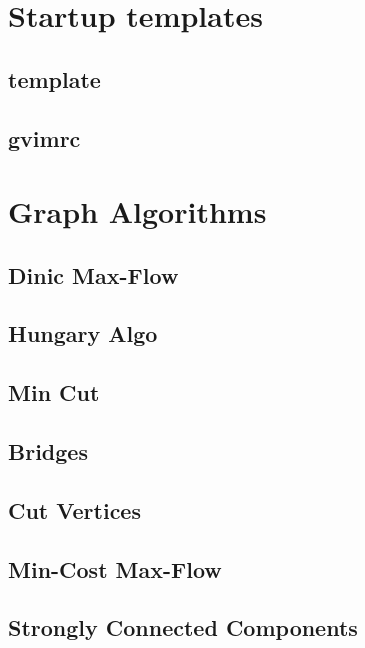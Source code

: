\documentclass[10pt]{article}
\begin{document}
\tableofcontents



\newpage
\section{Startup templates}
\subsection{template}

\subsection{gvimrc}




\newpage
\section{Graph Algorithms}
%
\subsection{Dinic Max-Flow}

\subsection{Hungary Algo}

\subsection{Min Cut}

\subsection{Bridges}

\subsection{Cut Vertices}

\subsection{Min-Cost Max-Flow}

\subsection{Strongly Connected Components}

\end{document}
